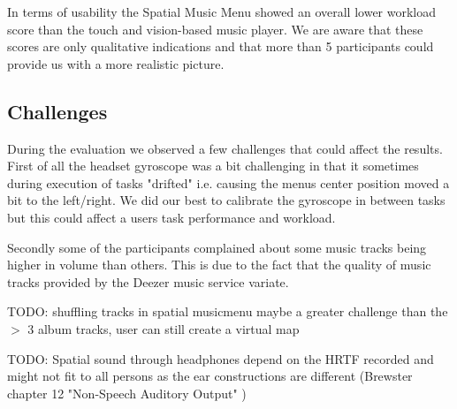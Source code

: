 In terms of usability the Spatial Music Menu showed an overall lower workload score than the touch and vision-based music player. We are aware that these scores are only qualitative indications and that more than 5 participants could provide us with a more realistic picture.

\subsection{Challenges}
During the evaluation we observed a few challenges that could affect the results. First of all the headset gyroscope was a bit challenging in that it sometimes during execution of tasks "drifted" i.e. causing the menus center position moved a bit to the left/right. We did our best to calibrate the gyroscope in between tasks but this could affect a users task performance and workload.

Secondly some of the participants complained about some music tracks being higher in volume than others. This is due to the fact that the quality of music tracks provided by the Deezer music service variate.

TODO: shuffling tracks in spatial musicmenu maybe a greater challenge than the $>$ 3 album tracks, user can still create a virtual map

TODO: Spatial sound through headphones depend on the HRTF recorded and might not fit to all persons as the ear constructions are different (Brewster chapter 12 "Non-Speech Auditory Output" \cite{brewster_human-computer_2003})
















